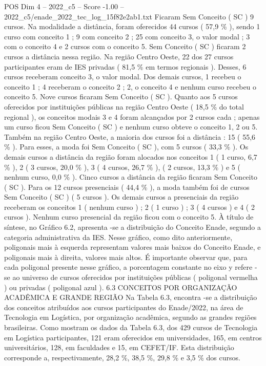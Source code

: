 \begin{textsample}{POS Dim 4 – 2022\_c5 – Score -1.00 – 2022\_c5/enade\_2022\_tec\_log\_15f82e2ab1.txt}
Ficaram Sem Conceito ( SC ) 9 cursos.
Na modalidade a distância, foram oferecidos 44 cursos ( 57,9 \% ), sendo 1 curso com conceito 1 ; 9 com conceito 2 ; 25 com conceito 3, o valor modal ; 3 com o conceito 4 e 2 cursos com o conceito 5.
Sem Conceito ( SC ) ficaram 2 cursos a distância nessa região.
Na região Centro Oeste, 22 dos 27 cursos participantes eram de IES privadas ( 81,5 \% em termos regionais ).
Desses, 6 cursos receberam conceito 3, o valor modal.
Dos demais cursos, 1 recebeu o conceito 1 ; 4 receberam o conceito 2 ; 2, o conceito 4 e nenhum curso recebeu o conceito 5.
Nove cursos ficaram Sem Conceito ( SC ).
Quanto aos 5 cursos oferecidos por instituições públicas na região Centro Oeste ( 18,5 \% do total regional ), os conceitos modais 3 e 4 foram alcançados por 2 cursos cada ; apenas um curso ficou Sem Conceito ( SC ) e nenhum curso obteve o conceito 1, 2 ou 5.
Também na região Centro Oeste, a maioria dos cursos foi a distância : 15 ( 55,6 \% ).
Para esses, a moda foi Sem Conceito ( SC ), com 5 cursos ( 33,3 \% ).
Os demais cursos a distância da região foram alocados nos conceitos 1 ( 1 curso, 6,7 \% ), 2 ( 3 cursos, 20,0 \% ), 3 ( 4 cursos, 26,7 \% ), ( 2 cursos, 13,3 \% ) e 5 ( nenhum curso, 0,0 \% ).
Cinco cursos a distância da região ficaram Sem Conceito ( SC ).
Para os 12 cursos presenciais ( 44,4 \% ), a moda também foi de cursos Sem Conceito ( SC ) ( 5 cursos ).
Os demais cursos a presenciais da região receberam os conceitos 1 ( nenhum curso ) ; 2 ( 1 curso ) ; 3 ( 4 cursos ) e 4 ( 2 cursos ).
Nenhum curso presencial da região ficou com o conceito 5.
À título de síntese, no Gráfico 6.2, apresenta -se a distribuição do Conceito Enade, segundo a categoria administrativa da IES.
Nesse gráfico, como dito anteriormente, poligonais mais à esquerda representam valores mais baixos do Conceito Enade, e poligonais mais à direita, valores mais altos.
É importante observar que, para cada poligonal presente nesse gráfico, a porcentagem constante no eixo y refere -se ao universo de cursos oferecidos por instituições públicas ( poligonal vermelha ) ou privadas ( poligonal azul ). 6.3 CONCEITOS POR ORGANIZAÇÃO ACADÊMICA E GRANDE REGIÃO Na Tabela 6.3, encontra -se a distribuição dos conceitos atribuídos aos cursos participantes do Enade/2022, na área de Tecnologia em Logística, por organização acadêmica, segundo as grandes regiões brasileiras.
Como mostram os dados da Tabela 6.3, dos 429 cursos de Tecnologia em Logística participantes, 121 eram oferecidos em universidades, 165, em centros universitários, 128, em faculdades e 15, em CEFET/IF.
Esta distribuição corresponde a, respectivamente, 28,2 \%, 38,5 \%, 29,8 \% e 3,5 \% dos cursos.

\end{textsample}
